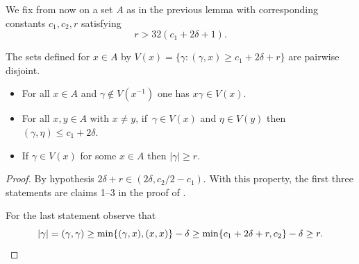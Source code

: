 We fix from now on a set \(A\) as in the previous lemma with corresponding constants \(c_1,c_2,r\) satisfying
\begin{equation}\label{requation}
r > 32(c_1+2\delta+1).
\end{equation}

\begin{lemma}\label{borrowedlemma}
The sets defined for \(x \in A\) by \(V(x) = \lbrace \gamma: (\gamma,x) \ge c_1+2\delta + r\rbrace\) are pairwise disjoint.

\begin{itemize}
\item
For all \(x \in A\) and \(\gamma \notin V(x^{-1})\) one has \(x\gamma \in V(x)\).

\item
For all \(x,y \in A\) with \(x \neq y\), if~\(\gamma \in V(x)\) and \(\eta \in V(y)\) then \((\gamma,\eta) \le c_1+2\delta\).

\item
If \(\gamma \in V(x)\) for some \(x \in A\) then \(|\gamma| \ge r\).
\end{itemize}
\end{lemma}
\begin{proof}
By hypothesis \(2\delta + r \in (2\delta,c_2/2 - c_1)\). With this property, the first three statements are claims 1--3 in the proof of \cite[Lem.\,4.1]{random}.

For the last statement observe that
\[
|\gamma| = (\gamma,\gamma) \ge \min\lbrace (\gamma,x),(x,x)\rbrace - \delta \ge \min \lbrace c_1 + 2\delta + r, c_2\rbrace - \delta \ge r.\qedhere
\]
\end{proof}

